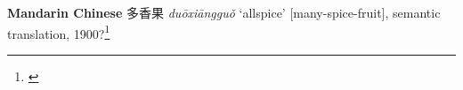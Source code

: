 \begin{etymology}\label{ety:duoxiangguo}
\textbf{Mandarin Chinese} {多香果} \textit{duōxiāngguǒ} `allspice' [many-spice-fruit], semantic translation, 1900?\footnote{\textcite{mdbg}}
\end{etymology}